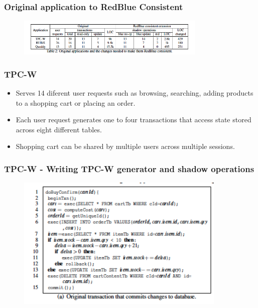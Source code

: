 \documentclass{beamer}
\begin{document}

\begin{frame}
\frametitle{Original application to RedBlue Consistent}
\begin{figure}[t]
\includegraphics[width=9cm]{pic10.jpg}
\centering
\end{figure}

\end{frame}



\begin{frame}
\frametitle{TPC-W}
\begin{itemize}
\item Serves 14 diferent user requests such as browsing, searching, adding products to a shopping cart or placing an order.
\item Each user request generates one to four transactions that access state stored across eight different tables.
\item Shopping cart can be shared by multiple users across multiple sessions.
\end{itemize}
\end{frame}


\begin{frame}
\frametitle{TPC-W - Writing TPC-W generator and shadow operations}
\begin{figure}[t]
\includegraphics[width=10cm]{pic11.jpg}
\centering
\end{figure}
\end{frame}
\end{document}
